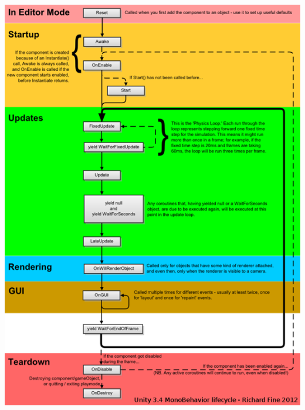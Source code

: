 \documentclass[9pt, b5paper]{article}
\begin{document}
\begin{center}
\includegraphics[width=.9\linewidth]{./pic/lfecycle.png}
\end{center}
\end{document}

